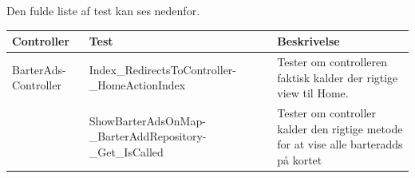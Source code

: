 Den fulde liste af test kan ses nedenfor.
\setlength{\arrayrulewidth}{0.3mm}
\setlength{\tabcolsep}{2pt}
\renewcommand{\arraystretch}{1.5}
\begin{table}[H]
	\begin{tabular}{ | p{3.0cm} | p{5.5cm} | p{8.0cm} | }
		\hline
		\textbf{Controller} & \textbf{Test} & \textbf{Beskrivelse} \\
		\hline
		BarterAds-Controller &  Index\_RedirectsToController-\_HomeActionIndex & Tester om controlleren faktisk kalder der rigtige view til Home. \\
		
		& ShowBarterAdsOnMap-\_BarterAddRepository-\_Get\_IsCalled & Tester om controller kalder den rigtige metode for at vise alle barteradds på kortet\\
	

\end{tabular}
\end{table}
